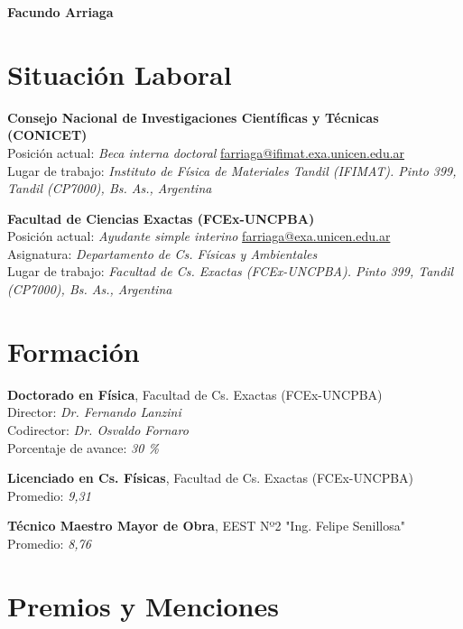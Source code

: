 \documentclass[11pt]{article}
\begin{document}
{\LARGE\bfseries Facundo Arriaga}

\bigskip


\bigskip

\section*{Situación Laboral}

 \textbf{Consejo Nacional de Investigaciones Científicas y Técnicas (CONICET)}\\
Posición actual: \textit{Beca interna doctoral} \url{farriaga@ifimat.exa.unicen.edu.ar}\\
Lugar de trabajo: \textit{Instituto de Física de Materiales Tandil (IFIMAT). Pinto 399, Tandil (CP7000), Bs. As., Argentina}

 \textbf{Facultad de Ciencias Exactas (FCEx-UNCPBA)}\\
Posición actual: \textit{Ayudante simple interino} \url{farriaga@exa.unicen.edu.ar}\\
Asignatura: \textit{Departamento de Cs. Físicas y Ambientales}\\
Lugar de trabajo: \textit{Facultad de Cs. Exactas (FCEx-UNCPBA). Pinto 399, Tandil (CP7000), Bs. As., Argentina}

\section*{Formación}

\textbf{Doctorado en Física}, Facultad de Cs. Exactas (FCEx-UNCPBA)\\
Director: \textit{Dr. Fernando Lanzini}\\
Codirector: \textit{Dr. Osvaldo Fornaro}\\
Porcentaje de avance: \textit{30 \%}

\textbf{Licenciado en Cs. Físicas}, Facultad de Cs. Exactas (FCEx-UNCPBA)\\
Promedio: \textit{9,31}

\textbf{Técnico Maestro Mayor de Obra}, EEST Nº2 "Ing. Felipe Senillosa"\\
Promedio: \textit{8,76}

\section*{Premios y Menciones}
\end{document}
